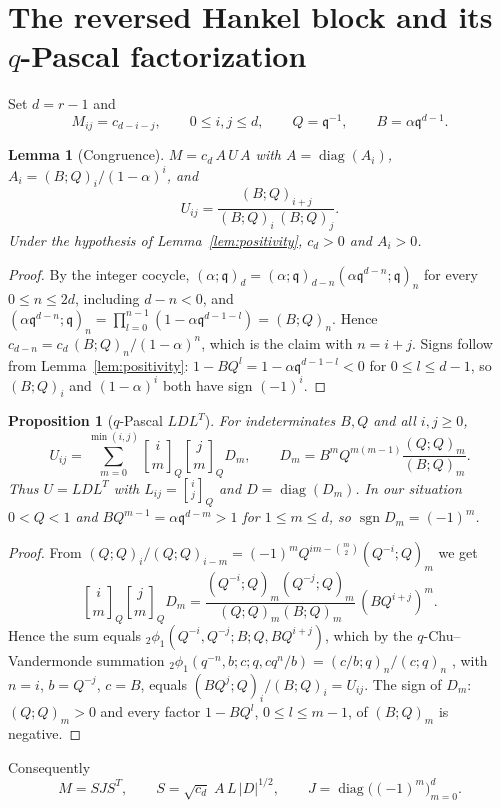 \documentclass[11pt,a4paper]{article}
\numberwithin{equation}{section}
\newtheorem{proposition}[theorem]{Proposition}
\newtheorem{lemma}[theorem]{Lemma}
\theoremstyle{definition}
\theoremstyle{remark}
\newcommand{\qq}{\mathfrak q}
\newcommand{\qbin}[3]{\genfrac{[}{]}{0pt}{}{#1}{#2}_{#3}}
\newcommand{\sgn}{\operatorname{sgn}}
\DeclareMathOperator{\diag}{diag}
\begin{document}
\section{The reversed Hankel block and its \texorpdfstring{$q$}{q}-Pascal factorization}

Set $d=r-1$ and
\[
M_{ij}=c_{d-i-j},\qquad 0\le i,j\le d,\qquad Q=\qq^{-1},\qquad B=\alpha\qq^{d-1}.
\]

\begin{lemma}[Congruence]\label{lem:congruence}
$M=c_d\,A\,U\,A$ with $A=\diag(A_i)$, $A_i=(B;Q)_i/(1-\alpha)^i$, and
\[
U_{ij}=\frac{(B;Q)_{i+j}}{(B;Q)_i\,(B;Q)_j}.
\]
Under the hypothesis of Lemma~\ref{lem:positivity}, $c_d>0$ and $A_i>0$.
\end{lemma}

\begin{proof}
By the integer cocycle, $(\alpha;\qq)_d=(\alpha;\qq)_{d-n}(\alpha\qq^{d-n};\qq)_n$ for every $0\le n\le 2d$, including
$d-n<0$, and $(\alpha\qq^{d-n};\qq)_n=\prod_{l=0}^{n-1}(1-\alpha\qq^{d-1-l})=(B;Q)_n$. Hence
$c_{d-n}=c_d\,(B;Q)_n/(1-\alpha)^n$, which is the claim with $n=i+j$. Signs follow from Lemma~\ref{lem:positivity}:
$1-BQ^l=1-\alpha\qq^{d-1-l}<0$ for $0\le l\le d-1$, so $(B;Q)_i$ and $(1-\alpha)^i$ both have sign $(-1)^i$.
\end{proof}

\begin{proposition}[$q$-Pascal $LDL^T$]\label{prop:LDL}
For indeterminates $B,Q$ and all $i,j\ge0$,
\[
U_{ij}=\sum_{m=0}^{\min(i,j)}\qbin im{Q}\qbin jm{Q}D_m,\qquad
D_m=B^mQ^{m(m-1)}\frac{(Q;Q)_m}{(B;Q)_m}.
\]
Thus $U=LDL^T$ with $L_{ij}=\qbin ij{Q}$ and $D=\diag(D_m)$. In our situation $0<Q<1$ and $BQ^{m-1}=\alpha\qq^{d-m}>1$
for $1\le m\le d$, so $\sgn D_m=(-1)^m$.
\end{proposition}

\begin{proof}
From $(Q;Q)_i/(Q;Q)_{i-m}=(-1)^mQ^{im-\binom m2}(Q^{-i};Q)_m$ we get
\[
\qbin im{Q}\qbin jm{Q}D_m=\frac{(Q^{-i};Q)_m(Q^{-j};Q)_m}{(Q;Q)_m(B;Q)_m}\,(BQ^{i+j})^m .
\]
Hence the sum equals ${}_2\phi_1(Q^{-i},Q^{-j};B;Q,BQ^{i+j})$, which by the $q$-Chu--Vandermonde summation
${}_2\phi_1(q^{-n},b;c;q,cq^n/b)=(c/b;q)_n/(c;q)_n$ \cite[\S1.5 and Appendix~II]{GR}, with $n=i$, $b=Q^{-j}$, $c=B$, equals
$(BQ^j;Q)_i/(B;Q)_i=U_{ij}$. The sign of $D_m$: $(Q;Q)_m>0$ and every factor $1-BQ^l$, $0\le l\le m-1$, of $(B;Q)_m$ is negative.
\end{proof}

Consequently
\begin{equation}\label{eq:SJS}
M=SJS^T,\qquad S=\sqrt{c_d}\;A\,L\,|D|^{1/2},\qquad J=\diag\big((-1)^m\big)_{m=0}^d .
\end{equation}
\end{document}

